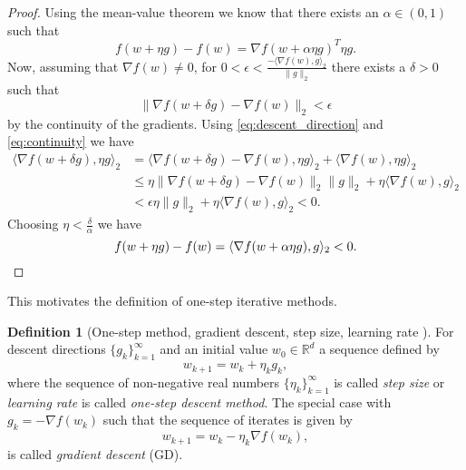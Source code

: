 \documentclass[12pt]{article}
\theoremstyle{definition}
\newtheorem{definition}[definition]{Definition}
\numberwithin{equation}{section}
\newcommand{\R}{\mathbb{R}}
\newcommand{\norm}[1]{\lVert{#1}\rVert_2}
\newcommand{\scp}[2]{\langle{#1}, {#2}\rangle_2}
\begin{document}
\begin{proof}
  Using the mean-value theorem \cite[pp.~629]{nocedalNumericalOptimization2006} we know that there exists an $\alpha \in (0,1)$ such that 
  \begin{equation*}
    f(w + \eta g) - f(w) = \nabla f(w+\alpha\eta g)^T\eta g.
  \end{equation*}
  Now, assuming that $\nabla f (w) \neq 0$, for $0 < \epsilon <
  \frac{-\scp{\nabla f(w)}{g}}{\norm{g}}$ there exists a $\delta > 0$ such that 
  \begin{equation}
    \label{eq:continuity}
    \norm{\nabla f(w + \delta g) - \nabla f(w)} < \epsilon
  \end{equation}
  by the continuity of the gradients.
  Using \eqref{eq:descent_direction} and \eqref{eq:continuity} we have
  \begin{equation*}
    \begin{split}
     \scp{\nabla f(w + \delta g)}{\eta g} &= \scp{\nabla f(w + \delta g)- \nabla f(w)}{\eta g}+ \scp{\nabla f(w)}{\eta g}\\
      &\leq \eta \norm{\nabla f(w + \delta g)- \nabla f(w)}\norm{g} + \eta \scp{\nabla f(w)}{g} \\
      &< \epsilon \eta \norm{g} + \eta \scp{\nabla f(w)}{g} < 0.
    \end{split}
  \end{equation*}
  Choosing $\eta < \frac{\delta}{\alpha}$ we have
  \begin{equation*}
    f(w + \eta g) - f(w) = \scp{\nabla f(w+\alpha\eta g)}{g} < 0. \qedhere
  \end{equation*}
\end{proof}
This motivates the definition of one-step iterative methods.
\begin{definition}[One-step method, gradient descent, step size, learning rate ]
  For descent directions $\{g_k\}_{k=1}^\infty$ and an initial value $w_{0}\in \R^d$ a sequence defined by
\begin{equation*}
  w_{k+1} = w_{k} + \eta_k g_k,
\end{equation*}
  where the sequence of non-negative real numbers $\{\eta_k\}_{k=1}^\infty$ is called \emph{step size} or \emph{learning rate} is called \emph{one-step descent method}. The special case with $g_k = -\nabla f(w_k)$ such that the sequence of iterates is given by
  \begin{equation}
    \label{eq:gradient_descent}
    w_{k+1} = w_{k} - \eta_k \nabla f(w_{k}),
  \end{equation}
  is called \emph{gradient descent} (GD).
\end{definition}
\end{document}
